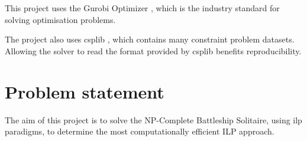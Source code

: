 This project uses the Gurobi Optimizer \citep{gurobi2024}, which is the industry standard for solving optimisation problems. 

The project also uses \gls{csplib} \citep{csplib:prob014}, which contains many constraint problem datasets. Allowing the solver to read the format provided by \gls{csplib} benefits reproducibility.

\section{Problem statement}\label{sec:problem}

The aim of this project is to solve the NP-Complete Battleship Solitaire, using \gls{ilp} paradigms, to determine the most computationally efficient ILP approach.